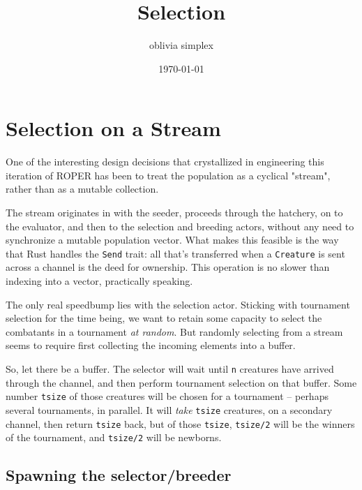 \documentclass[11pt]{article}
\author{oblivia simplex}
\date{\today}
\title{Selection}
\begin{document}
\maketitle
\tableofcontents


\section{Selection on a Stream}
\label{sec:org483caca}

One of the interesting design decisions that crystallized in engineering
this iteration of ROPER has been to treat the population as a cyclical
"stream", rather than as a mutable collection. 

The stream originates in with the seeder, proceeds through the hatchery,
on to the evaluator, and then to the selection and breeding actors, without
any need to synchronize a mutable population vector. What makes this feasible
is the way that Rust handles the \texttt{Send} trait: all that's transferred when a
\texttt{Creature} is sent across a channel is the deed for ownership. This operation
is no slower than indexing into a vector, practically speaking. 

The only real speedbump lies with the selection actor. Sticking with tournament
selection for the time being, we want to retain some capacity to select the
combatants in a tournament \emph{at random}. But randomly selecting from a stream
seems to require first collecting the incoming elements into a buffer. 

So, let there be a buffer. The selector will wait until \texttt{n} creatures have
arrived through the channel, and then perform tournament selection on that
buffer. Some number \texttt{tsize} of those creatures will be chosen for a tournament
-- perhaps several tournaments, in parallel. It will \emph{take} \texttt{tsize} creatures, 
on a secondary channel, then return \texttt{tsize} back, but of those \texttt{tsize}, \texttt{tsize/2}
will be the winners of the tournament, and \texttt{tsize/2} will be newborns.

\subsection{Spawning the selector/breeder}
\label{sec:orgc859780}
\end{document}
